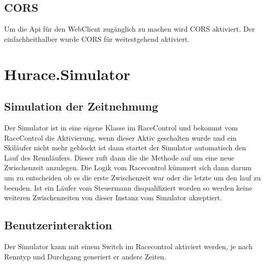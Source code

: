 \documentclass[a4paper, 12pt]{article}
\begin{document}
	\subsection{CORS}
	Um die Api für den WebClient zugänglich zu machen wird CORS aktiviert. Der einfachheithalber wurde CORS für weitestgehend aktiviert.
	
	
	\section{Hurace.Simulator}

	\subsection{Simulation der Zeitnehmung}
	Der Simulator ist in eine eigene Klasse im RaceControl und bekommt vom RaceControl die Aktivierung, wenn dieser Aktiv geschalten wurde und ein Skiläufer nicht mehr geblockt ist dann startet der Simulator automatisch den Lauf des Rennläufers. Dieser ruft dann die die Methode auf um eine neue Zwischenzeit anzulegen. 
	Die Logik vom Racecontrol kümmert sich dann darum um zu entscheiden ob es die erste Zwischenzeit war oder die letzte um den lauf zu beenden. Ist ein Läufer vom Steuermann disqualifiziert worden so werden keine weiteren Zwischenzeiten von dieser Instanz vom Simulator akzeptiert.
	
	\subsection{Benutzerinteraktion}
	Der Simulator kann mit einem Switch im Racecontrol aktiviert werden, je nach Renntyp und Durchgang generiert er andere Zeiten.
	
	
	\listoftodos
\end{document}
